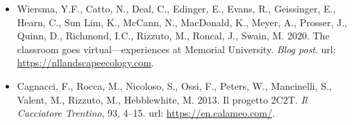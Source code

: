 \begin{itemize}[noitemsep] 
  \item Wiersma, Y.F., Catto, N., Deal, C., Edinger, E., Evans, R., Geissinger, E., Hearn, C., Sun Lim, K., McCann, N., MacDonald, K., Meyer, A., Prosser, J., Quinn, D., Richmond, I.C., \textcolor{awesome}{Rizzuto, M.}, Roncal, J., Swain, M. 2020. The classroom goes virtual---experiences at Memorial University. \emph{Blog post}. url: \href{https://nllandscapeecology.com/blog-post-teaching-and-learning-remotely-time-to-read-4-min-45-s/}{https://nllandscapeecology.com}.
  \item Cagnacci, F., Rocca, M., Nicoloso, S., Ossi, F., Peters, W., Mancinelli, S., Valent, M., \textcolor{awesome}{Rizzuto, M.}, Hebblewhite, M. 2013. Il progetto 2C2T. \emph{Il Cacciatore Trentino}, 93, 4--15. url: \href{https://en.calameo.com/read/00214567355b1384f96d0}{https://en.calameo.com/}.
\end{itemize}


  


  
